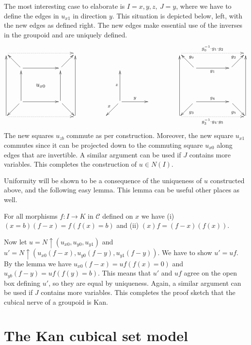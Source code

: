 \documentclass[10pt,a4paper]{article}
\newcommand{\CC}{{\mathcal C}}
\newcommand{\rup}[1]{#1{\uparrow}}
\begin{document}
The most interesting case to elaborate is $I=x,y,z,~J=y$,
where we have to define the edges in $u_{x1}$ in direction $y$.
This situation is depicted below, left, with the new edges as defined right.
The new edges make essential use of the inverses in the groupoid
and are uniquely defined.
\[
\xymatrix@R=.6cm@C=.6cm{
\ar@{.>}[rrrr]            &&&&         &
&&&&&         &
\ar@{.>}[rrrr]^{g_0^{-1}\cdot g_1\cdot g_2}           &&&&         \\
&\ar[lu]\ar[rr]        &&  \ar[ru]&   &
&&&&&   &
&\ar[lu]_{g_0} \ar[rr]_{g_1}         &&  \ar[ru]^{g_2} &   \\
&&u_{x0}&&                               &
&&&&&                               &
&&~~~&&                               \\
&\ar[ld]\ar[rr]\ar[uu]&&\ar[rd]\ar[uu]& &
&&\ar[ld]_x\ar[rr]^{y}\ar[uu]^z&&& &
&\ar[ld]^{g_3}\ar[rr]^{g_4}&&\ar[rd]_{g_5} & \\
\ar[uuuu]\ar@{.>}[rrrr]&&&&\ar[uuuu] &
&&&&&  &
\ar[uuuu]\ar@{.>}[rrrr]_{g_3^{-1}\cdot g_4\cdot g_5}&&&&\ar[uuuu]\\
}
\]
The new squares $u_{zb}$ commute as per construction.
Moreover, the new square $u_{x1}$ commutes since it can
be projected down to the commuting square $u_{x0}$
along edges that are invertible.
A similar argument can be used if $J$ contains more variables.
This completes the construction of $u\in N(I)$.

Uniformity will be shown to be a consequence of the uniqueness of
$u$ constructed above, and the following easy lemma.
This lemma can be useful other places as well.
\begin{lemma}  For all morphisms $f:I\to K$ in $\CC$ defined on $x$ we have
(i) $(x=b)(f-x) = f (f(x)=b)$ and (ii) $(x)f = (f-x)(f(x))$.
\end{lemma}
Now let $u=\rup{N}(u_{x0},u_{y0},u_{y1})$ and
$u'=\rup{N}(u_{x0}(f-x),u_{y0}(f-y),u_{y1}(f-y))$.
We have to show $u'=uf$.
By the lemma we have $u_{x0}(f-x) = uf(f(x)=0)$ and $u_{yb}(f-y) = uf(f(y)=b)$.
This means that $u'$ and $uf$ agree on the open box defining $u'$,
so they are equal by uniqueness.
Again, a similar argument can be used if $J$ contains more variables.
This completes the proof sketch that the cubical nerve of a groupoid is Kan.

\section{The Kan cubical set model}\label{sec:kancubsetmodel}
\end{document}
